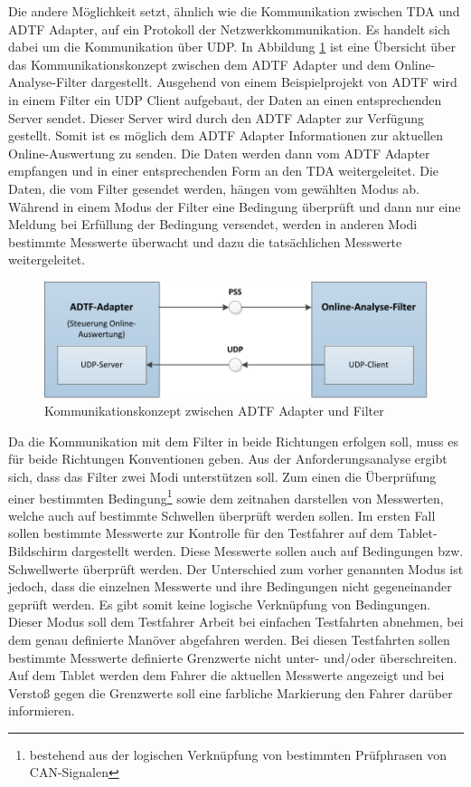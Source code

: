\documentclass[12pt,a4paper]{report}
\begin{document}
Die andere Möglichkeit setzt, ähnlich wie die Kommunikation zwischen TDA und ADTF Adapter, auf ein Protokoll der Netzwerkkommunikation. Es handelt sich dabei um die Kommunikation über UDP. In Abbildung \ref{pic:Kommunikationskonzept mit der Onlineanalyse} ist eine Übersicht über das Kommunikationskonzept zwischen dem ADTF Adapter und dem Online-Analyse-Filter dargestellt. Ausgehend von einem Beispielprojekt von ADTF wird in einem Filter ein UDP Client aufgebaut, der Daten an einen entsprechenden Server sendet. Dieser Server wird durch den ADTF Adapter zur Verfügung gestellt. Somit ist es möglich dem ADTF Adapter Informationen zur aktuellen Online-Auswertung zu senden. Die Daten werden dann vom ADTF Adapter empfangen und in einer entsprechenden Form an den TDA weitergeleitet. Die Daten, die vom Filter gesendet werden, hängen vom gewählten Modus ab. Während in einem Modus der Filter eine Bedingung überprüft und dann nur eine Meldung bei Erfüllung der Bedingung versendet, werden in anderen Modi bestimmte Messwerte überwacht und dazu die tatsächlichen Messwerte weitergeleitet.
\begin{figure}
\includegraphics[width=1\linewidth]{Darstellungen/Konzept-Adapter-Filter}
\caption{Kommunikationskonzept zwischen ADTF Adapter und Filter}\label{pic:Kommunikationskonzept mit der Onlineanalyse}
\end{figure}
Da die Kommunikation mit dem Filter in beide Richtungen erfolgen soll, muss es für beide Richtungen Konventionen geben. Aus der Anforderungsanalyse ergibt sich, dass das Filter zwei Modi unterstützen soll. Zum einen die Überprüfung einer bestimmten Bedingung\footnote{bestehend aus der logischen Verknüpfung von bestimmten Prüfphrasen von CAN-Signalen} sowie dem zeitnahen darstellen von Messwerten, welche auch auf bestimmte Schwellen überprüft werden sollen. Im ersten Fall sollen bestimmte Messwerte zur Kontrolle für den Testfahrer auf dem Tablet-Bildschirm dargestellt werden. Diese Messwerte sollen auch auf Bedingungen bzw. Schwellwerte überprüft werden. Der Unterschied zum vorher genannten Modus ist jedoch, dass die einzelnen Messwerte und ihre Bedingungen nicht gegeneinander geprüft werden. Es gibt somit keine logische Verknüpfung von Bedingungen. Dieser Modus soll dem Testfahrer Arbeit bei einfachen Testfahrten abnehmen, bei dem genau definierte Manöver abgefahren werden. Bei diesen Testfahrten sollen bestimmte Messwerte definierte Grenzwerte nicht unter- und/oder überschreiten. Auf dem Tablet werden dem Fahrer die aktuellen Messwerte angezeigt und bei Verstoß gegen die Grenzwerte soll eine farbliche Markierung den Fahrer darüber informieren.
\end{document}
